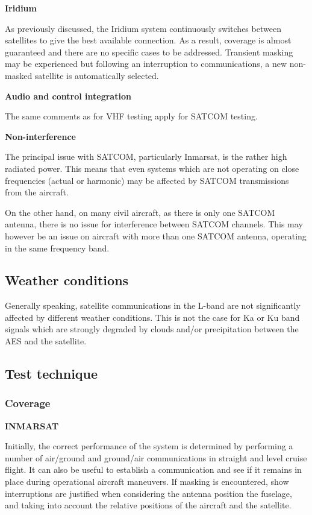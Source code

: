 \documentclass[
]{book}
\begin{document}
\textbf{Iridium}

As previously discussed, the Iridium system continuously switches between
satellites to give the best available connection. As a result, coverage is
almost guaranteed and there are no specific cases to be addressed. Transient
masking may be experienced but following an interruption to communications, a
new non-masked satellite is automatically selected.

\textbf{Audio and control integration}

The same comments as for VHF testing apply for SATCOM testing.

\textbf{Non-interference}

The principal issue with SATCOM, particularly Inmarsat, is the rather high
radiated power. This means that even systems which are not operating on close
frequencies (actual or harmonic) may be affected by SATCOM transmissions from
the aircraft.

On the other hand, on many civil aircraft, as there is only one SATCOM antenna,
there is no issue for interference between SATCOM channels. This may however be
an issue on aircraft with more than one SATCOM antenna, operating in the same
frequency band.

\hypertarget{weather-conditions-1}{%
\subsection{Weather conditions}\label{weather-conditions-1}}

Generally speaking, satellite communications in the L-band are not
significantly affected by different weather conditions. This is not the case
for Ka or Ku band signals which are strongly degraded by clouds and/or
precipitation between the AES and the satellite.

\hypertarget{test-technique-2}{%
\subsection{Test technique}\label{test-technique-2}}

\hypertarget{coverage-1}{%
\subsubsection{Coverage}\label{coverage-1}}

\textbf{INMARSAT}

Initially, the correct performance of the system is determined by performing a
number of air/ground and ground/air communications in straight and level cruise
flight. It can also be useful to establish a communication and see if it
remains in place during operational aircraft maneuvers. If masking is
encountered, show interruptions are justified when considering the antenna
position the fuselage, and taking into account the relative positions of the
aircraft and the satellite.
\end{document}
